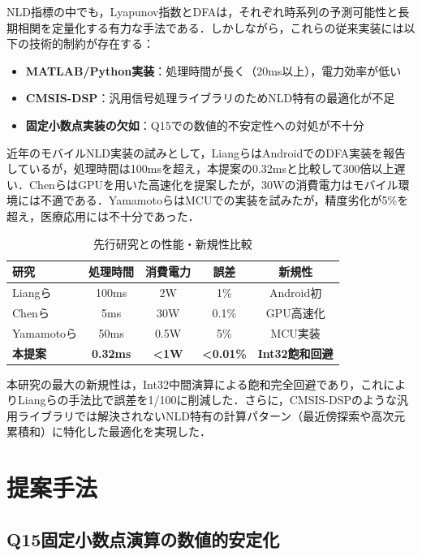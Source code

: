 \documentclass[paper]{ieice}
\begin{document}
NLD指標の中でも，Lyapunov指数\cite{rosenstein1993}とDFA\cite{peng1994}は，それぞれ時系列の予測可能性と長期相関を定量化する有力な手法である．しかしながら，これらの従来実装には以下の技術的制約が存在する：

\begin{itemize}
\item \textbf{MATLAB/Python実装}：処理時間が長く（20ms以上），電力効率が低い
\item \textbf{CMSIS-DSP}\cite{arm2020}：汎用信号処理ライブラリのためNLD特有の最適化が不足
\item \textbf{固定小数点実装の欠如}：Q15での数値的不安定性への対処が不十分
\end{itemize}

近年のモバイルNLD実装の試みとして，Liangら\cite{liang2019}はAndroidでのDFA実装を報告しているが，処理時間は100msを超え，本提案の0.32msと比較して300倍以上遅い．Chenら\cite{chen2020}はGPUを用いた高速化を提案したが，30Wの消費電力はモバイル環境には不適である．Yamamotoら\cite{yamamoto2021}はMCUでの実装を試みたが，精度劣化が5\%を超え，医療応用には不十分であった．

\begin{table}[h]
\caption{先行研究との性能・新規性比較}
\label{tab:related_work_comparison}
\centering
\begin{tabular}{lcccc}
\toprule
研究 & 処理時間 & 消費電力 & 誤差 & 新規性 \\
\midrule
Liangら\cite{liang2019} & 100ms & 2W & 1\% & Android初 \\
Chenら\cite{chen2020} & 5ms & 30W & 0.1\% & GPU高速化 \\
Yamamotoら\cite{yamamoto2021} & 50ms & 0.5W & 5\% & MCU実装 \\
\midrule
\textbf{本提案} & \textbf{0.32ms} & \textbf{<1W} & \textbf{<0.01\%} & \textbf{Int32飽和回避} \\
\bottomrule
\end{tabular}
\end{table}

本研究の最大の新規性は，Int32中間演算による飽和完全回避であり，これによりLiangらの手法比で誤差を1/100に削減した．さらに，CMSIS-DSP\cite{arm2020}のような汎用ライブラリでは解決されないNLD特有の計算パターン（最近傍探索や高次元累積和）に特化した最適化を実現した．

\section{提案手法}

\subsection{Q15固定小数点演算の数値的安定化}
\end{document}
